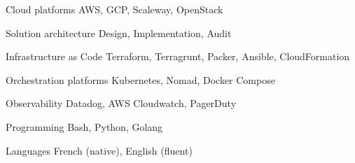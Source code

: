 

\begin{cvskills}

  \cvskill
    {Cloud platforms} %
    {AWS, GCP, Scaleway, OpenStack} %

  \cvskill
    {Solution architecture} %
    {Design, Implementation, Audit} %

  \cvskill
    {Infrastructure as Code} %
    {Terraform, Terragrunt, Packer, Ansible, CloudFormation} %

  \cvskill
    {Orchestration platforms} %
    {Kubernetes, Nomad, Docker Compose} %

  \cvskill
    {Observability} %
    {Datadog, AWS Cloudwatch, PagerDuty} %

  \cvskill
    {Programming} %
    {Bash, Python, Golang} %

  \cvskill
    {Languages} %
        {French (native), English (fluent)} %

\end{cvskills}
